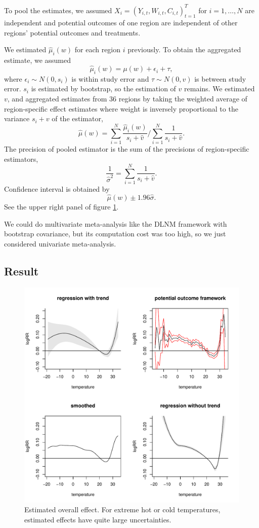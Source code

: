 \documentclass[12pt]{article}
\begin{document}
To pool the estimates,
we assumed $X_i = (Y_{i,t}, W_{i,t}, C_{i,t})_{t = 1}^T$ for $i = 1, \dots, N$ are independent
and potential outcomes of one region are independent of other regions' potential outcomes and treatments.

We estimated $\hat{\mu}_i(w)$ for each region $i$ previously.
To obtain the aggregated estimate, we assumed
\[
	\hat{\mu}_i(w) = \mu(w) + \epsilon_i + \tau,
\]
where $\epsilon_i \sim N(0, s_i)$ is within study error and $\tau \sim N(0, v)$ is between study error.
$s_i$ is estimated by bootstrap,
so the estimation of $v$ remains.
We estimated $v$, and aggregated estimates from 36 regions
by taking the weighted average of region-specific effect estimates
where weight is inversely proportional to the variance $s_i + v$ of the estimator,
\[
	\hat{\mu}(w) = \sum_{i = 1}^N \frac{\hat{\mu}_i(w)}{s_i + \hat{v}}
	/\sum_{i = 1}^N \frac{1}{s_i + \hat{v}}.
\]
The precision of pooled estimator is the sum of the precisions of region-specific estimators,
\[
	\frac{1}{\hat{\sigma}^2} = \sum_{i = 1}^N \frac{1}{s_i + \hat{v}}.
\]
Confidence interval is obtained by 
\[
	\hat{\mu}(w) \pm 1.96 \hat{\sigma}.
\]
See the upper right panel of figure \ref{figure:main}.

We could do multivariate meta-analysis like the DLNM framework with bootstrap covariance,
but its computation cost was too high, so we just considered univariate meta-analysis.


\subsection{Result}

\begin{figure}
	\includegraphics[width = \textwidth]{figures/main1.pdf}
	\caption{Estimated overall effect. 
	For extreme hot or cold temperatures, estimated effects have quite large uncertainties.}
	\label{figure:main}
\end{figure}
\end{document}

